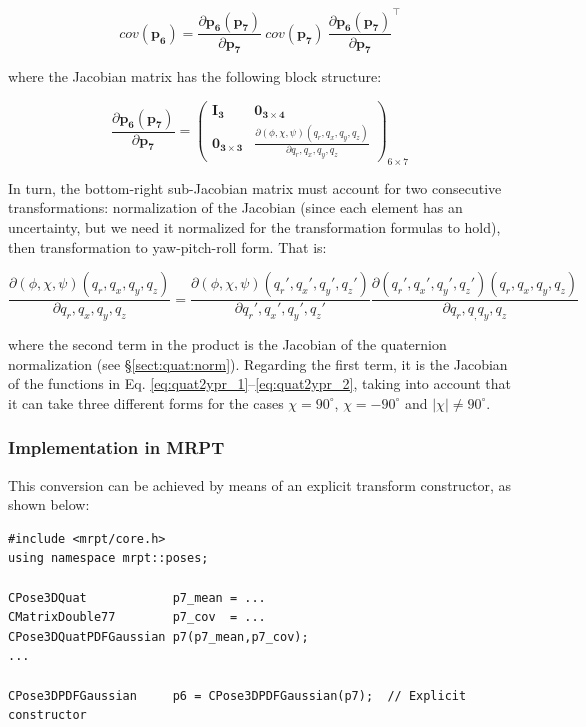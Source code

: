 \documentclass[a4paper,10pt]{report}
\begin{document}
\begin{equation}
cov(\mathbf{p_6}) =
\frac{\partial \mathbf{p_6}(\mathbf{p_7}) }{\partial \mathbf{p_7}} ~ 
cov(\mathbf{p_7})  ~
\frac{\partial \mathbf{p_6}(\mathbf{p_7}) }{\partial \mathbf{p_7}}^\top 
\end{equation}

\noindent where the Jacobian matrix has the following block structure:

\begin{equation}
\frac{\partial \mathbf{p_6}(\mathbf{p_7}) }{\partial \mathbf{p_7}} =
\left(
\begin{array}{c|c}
 \mathbf{I_3} & \mathbf{0_{3\times 4}} \\ \hline
 \mathbf{0_{3\times 3}} &  \frac{\partial (\phi,\chi,\psi)(q_r,q_x,q_y,q_z)}{\partial q_r,q_x,q_y,q_z}
\end{array}
\right)_{6 \times 7}
\end{equation}

In turn, the bottom-right sub-Jacobian matrix must account for two consecutive transformations: 
normalization of the Jacobian (since each element has an uncertainty, but we need it normalized
for the transformation formulas to hold), then transformation to yaw-pitch-roll form. That is:

\begin{equation}
\frac{\partial (\phi,\chi,\psi)(q_r,q_x,q_y,q_z)}{\partial q_r,q_x,q_y,q_z} =
\frac{\partial (\phi,\chi,\psi)(q_r',q_x',q_y',q_z')}{\partial q_r',q_x',q_y',q_z'}
\frac{\partial (q_r',q_x',q_y',q_z')(q_r,q_x,q_y,q_z)}{\partial q_r,q_,q_y,q_z}  
\end{equation}

\noindent where the second term in the product is the Jacobian of the quaternion 
normalization (see \S \ref{sect:quat:norm}). Regarding the first term, it is the 
Jacobian of the functions in Eq. \ref{eq:quat2ypr_1}--\ref{eq:quat2ypr_2}, taking
into account that it can take three different forms for the cases $\chi=90^\circ$,
$\chi=-90^\circ$ and $|\chi| \neq 90^\circ$.

\subsubsection{Implementation in MRPT}

This conversion can be achieved by means of an explicit transform constructor, as shown below:

\begin{lstlisting}
#include <mrpt/core.h> 
using namespace mrpt::poses; 

CPose3DQuat            p7_mean = ...
CMatrixDouble77        p7_cov  = ...
CPose3DQuatPDFGaussian p7(p7_mean,p7_cov);
...

CPose3DPDFGaussian     p6 = CPose3DPDFGaussian(p7);  // Explicit constructor
\end{lstlisting}
\end{document}
